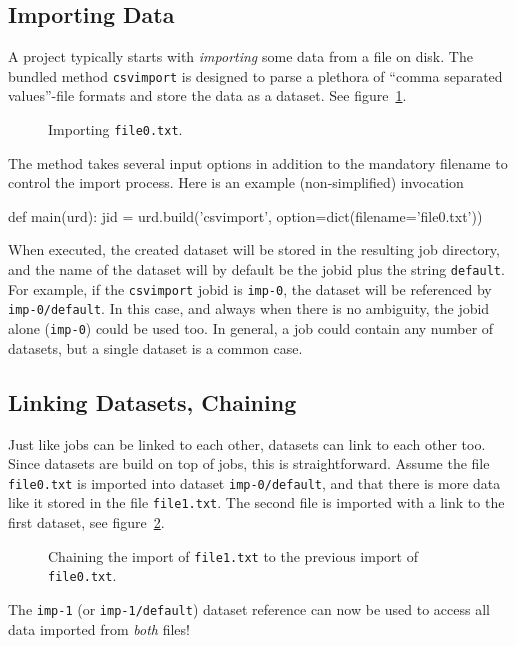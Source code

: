 \subsection{Importing Data}

A project typically starts with \textsl{importing} some data from a
file on disk.  The bundled method \texttt{csvimport} is designed to
parse a plethora of ``comma separated values''-file formats and store
the data as a dataset.  See figure~\ref{fig:dataset_csvimport}.
\begin{figure}[h!]
  \begin{center}
    
    \caption{Importing \texttt{file0.txt}.}
    \label{fig:dataset_csvimport}
  \end{center}
\end{figure}
The method takes several input options in addition to the mandatory
filename to control the import process.  Here is an example
(non-simplified) invocation
\begin{python}
def main(urd):
    jid = urd.build('csvimport', option=dict(filename='file0.txt'))  
\end{python}
When executed, the created dataset will be stored in the resulting job
directory, and the name of the dataset will by default be the jobid
plus the string \texttt{default}.  For example, if the
\texttt{csvimport} jobid is \texttt{imp-0}, the dataset will be
referenced by \texttt{imp-0/default}.  In this case, and always when
there is no ambiguity, the jobid alone (\texttt{imp-0}) could be used
too.  In general, a job could contain any number of datasets, but a
single dataset is a common case.




\subsection{Linking Datasets, Chaining}

Just like jobs can be linked to each other, datasets can link to each
other too.  Since datasets are build on top of jobs, this is
straightforward.  Assume the file \texttt{file0.txt} is imported into
dataset \texttt{imp-0/default}, and that there is more data like it
stored in the file \texttt{file1.txt}.  The second file is imported
with a link to the first dataset, see
figure~\ref{fig:dataset_csvimport_chain}.
\begin{figure}[h!]
  \begin{center}
    
    \caption{Chaining the import of \texttt{file1.txt} to the previous
      import of \texttt{file0.txt}.}
    \label{fig:dataset_csvimport_chain}
  \end{center}
\end{figure}
The \texttt{imp-1} (or \texttt{imp-1/default}) dataset reference can
now be used to access all data imported from \textsl{both} files!

